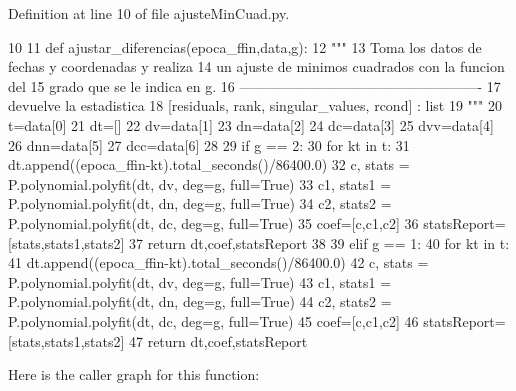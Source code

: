 \-Definition at line 10 of file ajuste\-Min\-Cuad.\-py.


\begin{DoxyCode}
10 
11 def ajustar_diferencias(epoca_ffin,data,g):
12     """
13     Toma los datos de fechas y coordenadas y realiza
14     un ajuste de minimos cuadrados con la funcion del 
15     grado que se le indica en g.
16     ----------------------------------------------------
17     devuelve la estadistica
18     [residuals, rank, singular_values, rcond] : list
19     """
20     t=data[0]
21     dt=[]
22     dv=data[1]
23     dn=data[2]
24     dc=data[3]
25     dvv=data[4]
26     dnn=data[5]
27     dcc=data[6]
28     
29     if g == 2:    
30         for kt in t:
31             dt.append((epoca_ffin-kt).total_seconds()/86400.0)
32         c, stats = P.polynomial.polyfit(dt, dv, deg=g, full=True)
33         c1, stats1 = P.polynomial.polyfit(dt, dn, deg=g, full=True)
34         c2, stats2 = P.polynomial.polyfit(dt, dc, deg=g, full=True)
35         coef=[c,c1,c2]
36         statsReport=[stats,stats1,stats2] 
37         return dt,coef,statsReport
38     
39     elif g == 1:
40         for kt in t:
41             dt.append((epoca_ffin-kt).total_seconds()/86400.0)
42         c, stats = P.polynomial.polyfit(dt, dv, deg=g, full=True)
43         c1, stats1 = P.polynomial.polyfit(dt, dn, deg=g, full=True)
44         c2, stats2 = P.polynomial.polyfit(dt, dc, deg=g, full=True)
45         coef=[c,c1,c2]
46         statsReport=[stats,stats1,stats2] 
47         return dt,coef,statsReport
        \end{DoxyCode}


\-Here is the caller graph for this function\-:


